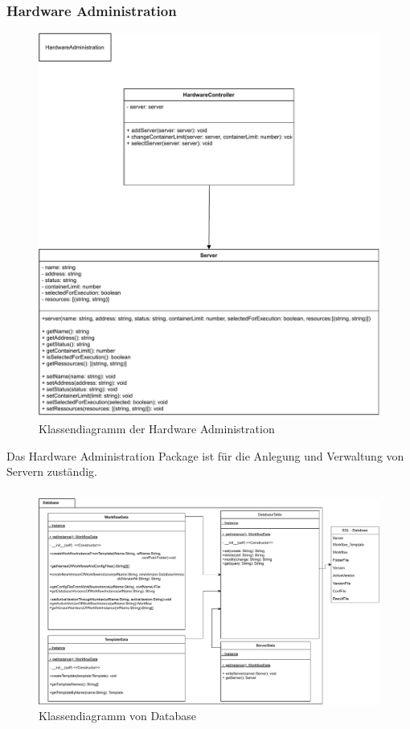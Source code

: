 \subsubsection{Hardware Administration}
\begin{figure}[h!]
    \includegraphics[width=1\textwidth]{res/HardwareAdministration.pdf}
    \caption{Klassendiagramm der Hardware Administration}
\end{figure}
\FloatBarrier
Das Hardware Administration Package ist für die Anlegung und Verwaltung von Servern zuständig.

\FloatBarrier
\newpage

\subsubsection{}
\begin{figure}[h!]
	\centering
	\includegraphics[width=1\textwidth]{res/Database_Package.pdf} 
	\caption{Klassendiagramm von Database}
	\label{fig:database_package}
\end{figure}

